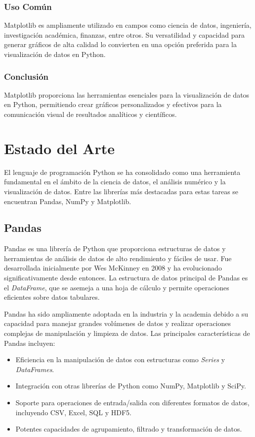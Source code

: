 \documentclass[conference]{IEEEtran}
\begin{document}
    \subsubsection*{Uso Común}
    Matplotlib es ampliamente utilizado en campos como ciencia de datos, ingeniería, investigación académica, finanzas, entre otros. Su versatilidad y capacidad para generar gráficos de alta calidad lo convierten en una opción preferida para la visualización de datos en Python.
    
    \subsubsection*{Conclusión}
    Matplotlib proporciona las herramientas esenciales para la visualización de datos en Python, permitiendo crear gráficos personalizados y efectivos para la comunicación visual de resultados analíticos y científicos.
    
\section{Estado del Arte}
    El lenguaje de programación Python se ha consolidado como una herramienta fundamental en el ámbito de la ciencia de datos, el análisis numérico y la visualización de datos. Entre las librerías más destacadas para estas tareas se encuentran Pandas, NumPy y Matplotlib.
    
    \subsection{Pandas}
    Pandas es una librería de Python que proporciona estructuras de datos y herramientas de análisis de datos de alto rendimiento y fáciles de usar. Fue desarrollada inicialmente por Wes McKinney en 2008 y ha evolucionado significativamente desde entonces. La estructura de datos principal de Pandas es el \textit{DataFrame}, que se asemeja a una hoja de cálculo y permite operaciones eficientes sobre datos tabulares.
    
    Pandas ha sido ampliamente adoptada en la industria y la academia debido a su capacidad para manejar grandes volúmenes de datos y realizar operaciones complejas de manipulación y limpieza de datos. Las principales características de Pandas incluyen:
    
    \begin{itemize}
        \item Eficiencia en la manipulación de datos con estructuras como \textit{Series} y \textit{DataFrames}.
        \item Integración con otras librerías de Python como NumPy, Matplotlib y SciPy.
        \item Soporte para operaciones de entrada/salida con diferentes formatos de datos, incluyendo CSV, Excel, SQL y HDF5.
        \item Potentes capacidades de agrupamiento, filtrado y transformación de datos.
    \end{itemize}
    
\end{document}
